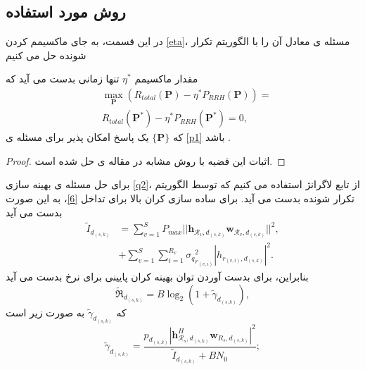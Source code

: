 \subsection{روش مورد استفاده}
در این قسمت، به جای ماکسیمم کردن \eqref{eta}، مسئله ی معادل آن را با الگوریتم تکرار شونده حل می کنیم
\begin{theorem}\label{t2}
مقدار ماکسیمم $\eta^*$  تنها زمانی بدست می آید که
\begin{equation}\label{q2}
\begin{split}
&\max \limits_{\boldsymbol{P}} (R_{total}(\boldsymbol{P}) - \eta^* P_{RRH}(\boldsymbol{P}))=\\
& R_{total}(\boldsymbol{P}^*) - \eta^* P_{RRH}(\boldsymbol{P}^*) =0,
\end{split}
\end{equation}
که $\{\boldsymbol{P}\}$  یک پاسخ امکان پذیر برای مسئله ی \eqref{p1} باشد \cite{hcranEE}.
\end{theorem}
\begin{proof}
اثبات این قضیه با روش مشابه در مقاله ی \cite{hcranEE} حل شده است.
\end{proof}

برای حل مسئله ی بهینه سازی \eqref{q2}، از تابع لاگرانژ استفاده می کنیم \cite{boyd} که توسط الگوریتم تکرار شونده بدست می آید. برای ساده سازی کران بالا برای تداخل  \eqref{6}، به این صورت بدست می آید
\begin{equation}
\begin{split}
\tilde{I}_{d_{(s,k)}} &= \sum_{v=1}^{S} P_{max}|| \boldsymbol{h}_{\mathcal{R}_v,d_{(s,k)}} \boldsymbol{w}_{\mathcal{R}_v,d_{(s,k)}}||^2 ,\\
& +  \sum_{v=1}^{S} \sum_{i=1}^{{R}_v} {\sigma_q}_{r_{(v,i)}}^2  |h_{r_{(v,i)}, d_{(s,k)}}|^2.
\end{split}
\end{equation}
بنابراین، برای بدست آوردن توان بهینه کران پایینی برای نرخ بدست می آید
\begin{equation}\label{e11}
\mathfrak{\tilde{R}}_{d_{(s,k)}} = B \log_2(1+\tilde{\gamma}_{d_{(s,k)}}),
\end{equation}
که  $\tilde{\gamma}_{d_{(s,k)}}$ به صورت زیر است 
\begin{equation}\label{15}
\tilde{\gamma}_{d_{(s,k)}} =  \frac{p_{d_{(s,k)}}|\boldsymbol{h}_{\mathcal{R}_s, d_{(s,k)}}^H \boldsymbol{w}_{R_{s},d_{(s,k)}}|^2}{\tilde{I}_{d_{(s,k)}}+BN_0};
\end{equation}

